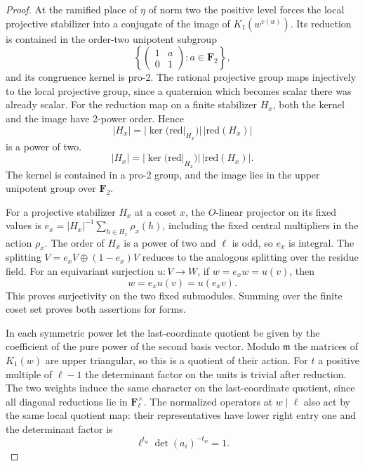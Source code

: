 \begin{proof}
At the ramified place of \(\eta\) of norm two
the positive level forces the local projective stabilizer
into a conjugate of the image of \(K_1(w^{c(w)})\).
Its reduction is contained in the order-two unipotent subgroup
\[
 \left\{\begin{pmatrix}1&a\\0&1\end{pmatrix}:a\in\mathbf F_2\right\},
\]
and its congruence kernel is pro-\(2\). The rational
projective group maps injectively to the local projective
group, since a quaternion which becomes scalar there was
already scalar. For the reduction map on a finite stabilizer \(H_x\), both the kernel and the image have 2-power order. Hence
\[
 |H_x|=|\ker(\mathrm{red}|_{H_x})|\,|\mathrm{red}(H_x)|
\]
is a power of two.
\[
 |H_x|=|\ker(\mathrm{red}|_{H_x})|\,
       |\mathrm{red}(H_x)| .
\]
The kernel is contained in a pro-2 group, and the image lies in the upper unipotent group over \(\mathbf F_2\).

For a projective stabilizer \(H_x\) at a coset \(x\),
the \(O\)-linear projector on its fixed values is
\(e_x=|H_x|^{-1}\sum_{h\in H_x}\rho_x(h)\), including
the fixed central multipliers in the action \(\rho_x\).
The order of \(H_x\) is a power of two and \(\ell\) is odd,
so \(e_x\) is integral. The splitting \(V=e_xV\oplus(1-e_x)V\) reduces to the analogous splitting over the residue field. For an equivariant surjection \(u:V\to W\), if \(w=e_xw=u(v)\), then
\[
 w=e_xu(v)=u(e_x v).
\]
This proves surjectivity on the two fixed submodules. Summing over the finite coset set
proves both assertions for forms.

In each symmetric power let the last-coordinate quotient
be given by the coefficient of the pure power of the
second basis vector. Modulo \(\mathfrak m\) the matrices
of \(K_1(w)\) are upper triangular, so this is a quotient
of their action. For \(t\) a positive multiple of \(\ell-1\)
the determinant factor on the units is trivial after
reduction. The two weights induce the same character on
the last-coordinate quotient, since all diagonal reductions
lie in \(\mathbf F_\ell^\times\). The normalized operators
at \(w\mid\ell\) also act by the same local quotient map:
their representatives have lower right entry one and the determinant factor is
\[
 \ell^{t_w}\det(a_i)^{-t_w}=1.
\]


\end{proof}
